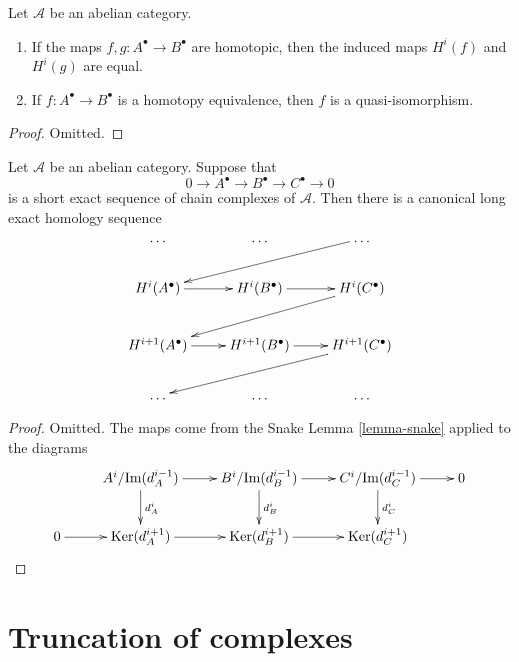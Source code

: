 \begin{lemma}
\label{lemma-map-cohomology-homotopy-cochain}
Let $\mathcal{A}$ be an abelian category.
\begin{enumerate}
\item If the maps $f, g : A^\bullet \to B^\bullet$ are
homotopic, then the induced maps $H^i(f)$ and $H^i(g)$
are equal.
\item If $f : A^\bullet \to B^\bullet$ is a homotopy equivalence,
then $f$ is a quasi-isomorphism.
\end{enumerate}
\end{lemma}

\begin{proof}
Omitted.
\end{proof}

\begin{lemma}
\label{lemma-long-exact-sequence-cochain}
Let $\mathcal{A}$ be an abelian category.
Suppose that
$$
0 \to
A^\bullet \to
B^\bullet \to
C^\bullet \to
0
$$
is a short exact sequence of chain complexes of $\mathcal{A}$.
Then there is a canonical long exact homology sequence
$$
\xymatrix{
\ldots & \ldots & \dots \ar[lld] \\
H^i(A^\bullet) \ar[r] &
H^i(B^\bullet) \ar[r] &
H^i(C^\bullet) \ar[lld] \\
H^{i + 1}(A^\bullet) \ar[r] &
H^{i + 1}(B^\bullet) \ar[r] &
H^{i + 1}(C^\bullet) \ar[lld] \\
\ldots & \ldots & \dots \\
}
$$
\end{lemma}

\begin{proof}
Omitted. The maps come from the Snake Lemma \ref{lemma-snake}
applied to the diagrams
$$
\xymatrix{
&
A^i/\text{Im}(d_A^{i - 1}) \ar[r] \ar[d]^{d_A^i} &
B^i/\text{Im}(d_B^{i - 1}) \ar[r] \ar[d]^{d_B^i} &
C^i/\text{Im}(d_C^{i - 1}) \ar[r] \ar[d]^{d_C^i} &
0 \\
0 \ar[r] &
\text{Ker}(d_A^{i + 1}) \ar[r] &
\text{Ker}(d_B^{i + 1}) \ar[r] &
\text{Ker}(d_C^{i + 1}) &
}
$$
\end{proof}






\section{Truncation of complexes}
\label{section-truncations}

